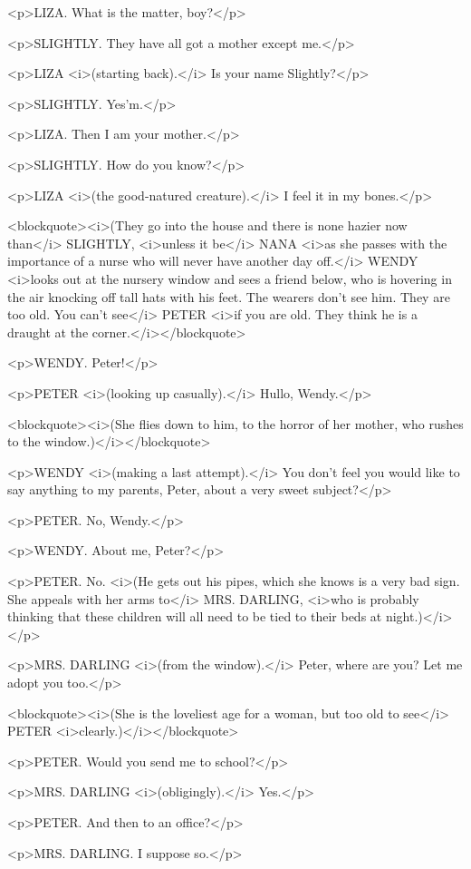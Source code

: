<p>LIZA. What is the matter, boy?</p>

<p>SLIGHTLY. They have all got a mother except me.</p>

<p>LIZA <i>(starting back).</i> Is your name Slightly?</p>

<p>SLIGHTLY. Yes'm.</p>

<p>LIZA. Then I am your mother.</p>

<p>SLIGHTLY. How do you know?</p>

<p>LIZA <i>(the good-natured creature).</i> I feel it in my
bones.</p>

<blockquote><i>(They go into the house and there is none hazier now
than</i> SLIGHTLY, <i>unless it be</i> NANA <i>as she passes with the
importance of a nurse who will never have another day off.</i> WENDY
<i>looks out at the nursery window and sees a friend below, who is
hovering in the air knocking off tall hats with his feet. The wearers
don't see him. They are too old. You can't see</i> PETER <i>if you
are old. They think he is a draught at the corner.</i></blockquote>

<p>WENDY. Peter!</p>

<p>PETER <i>(looking up casually).</i> Hullo, Wendy.</p>

<blockquote><i>(She flies down to him, to the horror of her mother,
who rushes to the window.)</i></blockquote>

<p>WENDY <i>(making a last attempt).</i> You don't feel you would
like to say anything to my parents, Peter, about a very sweet
subject?</p>

<p>PETER. No, Wendy.</p>

<p>WENDY. About me, Peter?</p>

<p>PETER. No. <i>(He gets out his pipes, which she knows is a very
bad sign. She appeals with her arms to</i> MRS. DARLING, <i>who is
probably thinking that these children will all need to be tied to
their beds at night.)</i></p>

<p>MRS. DARLING <i>(from the window).</i> Peter, where are you? Let
me adopt you too.</p>

<blockquote><i>(She is the loveliest age for a woman, but too old to
see</i> PETER <i>clearly.)</i></blockquote>

<p>PETER. Would you send me to school?</p>

<p>MRS. DARLING <i>(obligingly).</i> Yes.</p>

<p>PETER. And then to an office?</p>

<p>MRS. DARLING. I suppose so.</p>

